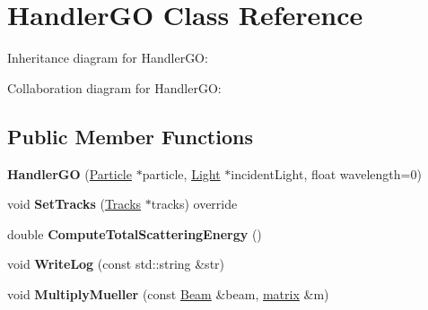 \hypertarget{class_handler_g_o}{}\section{Handler\+GO Class Reference}
\label{class_handler_g_o}


Inheritance diagram for Handler\+GO\+:


Collaboration diagram for Handler\+GO\+:
\subsection*{Public Member Functions}
\begin{DoxyCompactItemize}
\item 
\mbox{\label{class_handler_g_o_a45c45f6377f684d741c59f787948ac13}} 
{\bfseries Handler\+GO} (\mbox{\hyperlink{class_particle}{Particle}} $\ast$particle, \mbox{\hyperlink{class_light}{Light}} $\ast$incident\+Light, float wavelength=0)
\item 
\mbox{\label{class_handler_g_o_a8392befdf6e4cef1d06d7e46b79155f3}} 
void {\bfseries Set\+Tracks} (\mbox{\hyperlink{class_tracks}{Tracks}} $\ast$tracks) override
\item 
\mbox{\label{class_handler_g_o_ad5c3f91af1f7c07be11a9a679804cfa0}} 
double {\bfseries Compute\+Total\+Scattering\+Energy} ()
\item 
\mbox{\label{class_handler_g_o_a5b6812ce2b1f202085f12aeb19eaa663}} 
void {\bfseries Write\+Log} (const std\+::string \&str)
\item 
\mbox{\label{class_handler_g_o_aec3a04f8bb8188f61acd6a3602a603d1}} 
void {\bfseries Multiply\+Mueller} (const \mbox{\hyperlink{class_beam}{Beam}} \&beam, \mbox{\hyperlink{classmatrix}{matrix}} \&m)
\end{DoxyCompactItemize}
